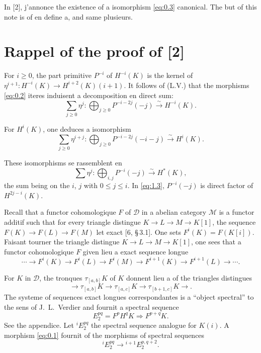 \documentclass[11pt,a4paper]{article}
\theoremstyle{plain}
\theoremstyle{definition}
\newcommand{\cD}{\mathscr{D}}
\newcommand{\cM}{\mathscr{M}}
\begin{document}
In [2], j'annonce the existence of a isomorphism \eqref{eq:0.3} canonical. The but of this note is of en define a, and same plusieurs.

\section{Rappel of the proof of [2]}

For $i \geqslant 0$, the part primitive $P^{-i}$ of $H^{-i}(K)$ is the kernel of $\eta^{i+1} \colon H^{-i}(K) \to H^{i+2}(K)(i+1)$. It follows of (L.V.) that the morphisms \eqref{eq:0.2} iteres induisent a decomposition en direct sum:
\begin{equation}\label{eq:1.1}
\sum_{j \geqslant 0} \eta^j \colon \bigoplus_{j \geqslant 0} P^{-i-2j}(-j) \xrightarrow{\sim} H^{-i}(K).
\end{equation}

For $H^i(K)$, one deduces a isomorphism
\begin{equation}\label{eq:1.2}
\sum_{j \geqslant 0} \eta^{i+j} \colon \bigoplus_{j \geqslant 0} P^{-i-2j}(-i-j) \xrightarrow{\sim} H^i(K).
\end{equation}

These isomorphisms se rassemblent en
\begin{equation}\label{eq:1.3}
\sum \eta^j \colon \bigoplus_{i,j} P^{-i}(-j) \xrightarrow{\sim} H^*(K),
\end{equation}
the sum being on the $i$, $j$ with $0 \leqslant j \leqslant i$. In \eqref{eq:1.3}, $P^{-i}(-j)$ is direct factor of $H^{2j-i}(K)$.

Recall that a functor cohomologique $F$ of $\cD$ in a abelian category $\cM$ is a functor additif such that for every triangle distingue $K \to L \to M \to K[1]$, the sequence $F(K) \to F(L) \to F(M)$ let exact [6, \S\,3.1]. One sets $F^i(K) = F(K[i])$. Faisant tourner the triangle distingue $K \to L \to M \to K[1]$, one sees that a functor cohomologique $F$ given lieu a exact sequence longue
\[
\cdots \to F^i(K) \to F^i(L) \to F^i(M) \to F^{i+1}(K) \to F^{i+1}(L) \to \cdots.
\]

For $K$ in $\cD$, the tronques $\tau_{[a,b]}K$ of $K$ donnent lieu a of the triangles distingues
\[
\to \tau_{[a,b]}K \to \tau_{[a,c]}K \to \tau_{[b+1,c]}K \to .
\]
The systeme of sequences exact longues correspondantes is a ``object spectral'' to the sens of J.~L.~Verdier and fournit a spectral sequence
\[
E_2^{pq} = F^p H^q K \Rightarrow F^{p+q} K.
\]
See the appendice. Let ${}^i\!E_2^{pq}$ the spectral sequence analogue for $K(i)$. A morphism \eqref{eq:0.1} fournit of the morphisms of spectral sequences
\[
{}^i\!E_2^{pq} \to {}^{i+1}\!E_2^{p,q+2}.
\]
\end{document}
